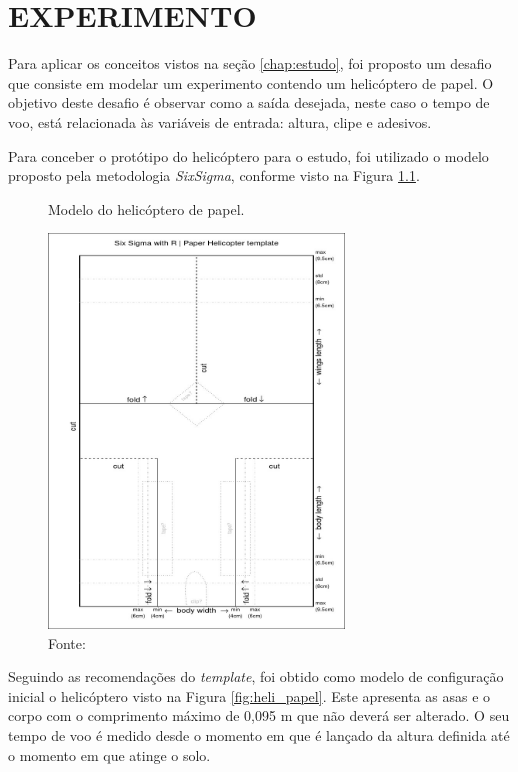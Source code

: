 \chapter{EXPERIMENTO}
\label{chap:experimento}

Para aplicar os conceitos vistos na seção \ref{chap:estudo}, foi proposto um desafio que consiste em modelar um experimento contendo um helicóptero de papel. O objetivo deste desafio é observar como a saída desejada, neste caso o tempo de voo, está relacionada às variáveis de entrada: altura, clipe e adesivos.  

Para conceber o protótipo do helicóptero para o estudo, foi utilizado o modelo proposto pela metodologia \textit{SixSigma}, conforme visto na Figura \ref{fig:model_heli}. 

\begin{figure}[H]
  \caption{Modelo do helicóptero de papel.}
  \centering
  \includegraphics[width=0.7\textwidth]{images/helicopter.jpeg}
  \caption*{Fonte: \cite{Design}}
  \label{fig:model_heli}
\end{figure}

Seguindo as recomendações do \textit{template}, foi obtido como modelo de configuração inicial o helicóptero visto na Figura \ref{fig:heli_papel}. Este apresenta as asas e o corpo com o comprimento máximo de 0,095 m que não deverá ser alterado. O seu tempo de voo é medido desde o momento em que é lançado da altura definida até o momento em que atinge o solo.


